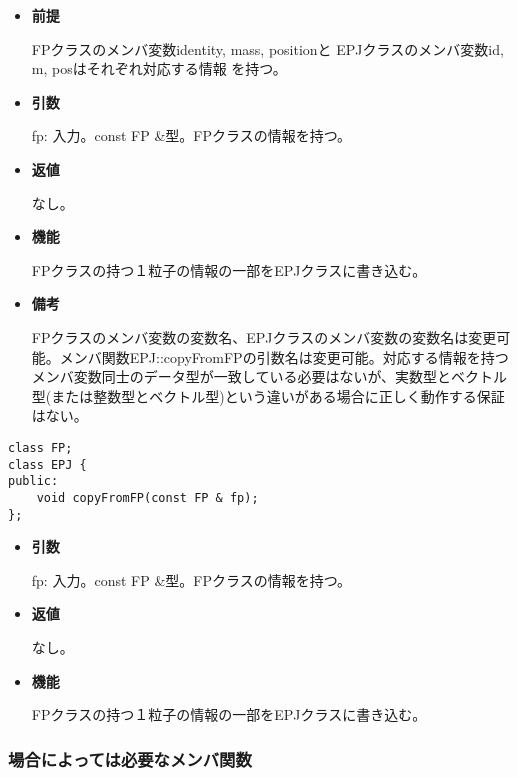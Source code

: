 \begin{itemize}

\item {\bf 前提}

  FPクラスのメンバ変数identity, mass, positionと
  EPJクラスのメンバ変数id, m, posはそれぞれ対応する情報
  を持つ。

\item {\bf 引数}

  fp: 入力。const FP \&型。FPクラスの情報を持つ。
  
\item {\bf 返値}

  なし。
  
\item {\bf 機能}

  FPクラスの持つ１粒子の情報の一部をEPJクラスに書き込む。
  
\item {\bf 備考}

  FPクラスのメンバ変数の変数名、EPJクラスのメンバ変数の変数名は変更可
  能。メンバ関数EPJ::copyFromFPの引数名は変更可能。対応する情報を持つ
  メンバ変数同士のデータ型が一致している必要はないが、実数型とベクトル
  型(または整数型とベクトル型)という違いがある場合に正しく動作する保証
  はない。

\end{itemize}
\fi

\begin{screen}
\begin{verbatim}
class FP;
class EPJ {
public:
    void copyFromFP(const FP & fp);
};
\end{verbatim}
\end{screen}

\begin{itemize}

\item {\bf 引数}

  fp: 入力。const FP \&型。FPクラスの情報を持つ。
  
\item {\bf 返値}

  なし。
  
\item {\bf 機能}

  FPクラスの持つ１粒子の情報の一部をEPJクラスに書き込む。
  
\end{itemize}

\subsubsection{場合によっては必要なメンバ関数}

